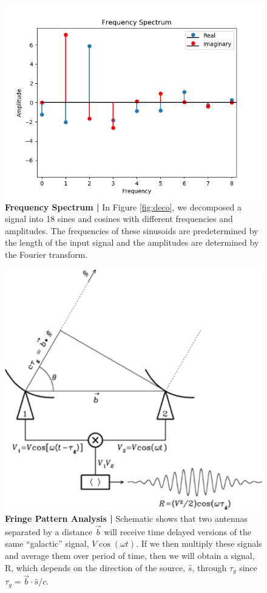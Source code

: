 \documentclass[12pt,a4paper]{article}
\begin{document}
\begin{figure}
\centering
\includegraphics[width=\textwidth]{_images/FreqSpec.png}
\caption{\textbf{Frequency Spectrum |} In Figure \ref{fig:deco}, we decomposed a signal into 18 sines and cosines with different frequencies and amplitudes. The frequencies of these sinusoids are predetermined by the length of the input signal and the amplitudes are determined by the Fourier transform. 
}
\end{figure}



\begin{figure}
\centering
\includegraphics[width=.8\textwidth]{_images/AntGeometry.png}
\caption{\textbf{Fringe Pattern Analysis |} Schematic shows that two antennas separated by a distance $\vec{b}$ will receive time delayed versions of the same ``galactic'' signal, $V\cos(\omega t)$. If we then multiply these signals and average them over period of time, then we will obtain a signal, R, which depends on the direction of the source, $\hat{s}$, through $\tau_g$ since $\tau_g = \vec{b} \cdot \hat{s} / c$.
}
\end{figure}
\end{document}

